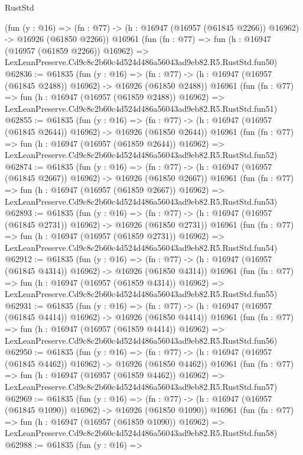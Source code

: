 \begin{lexlean}{RustStd}
\begin{coremodule}
    (fun (y : @16) =>
    (fn : @77) -> (h : @16947 (@16957 (@61845 @2266)) @16962) -> @16926 (@61850 @2266))
    @16961
    (fun (fn : @77) =>
    fun (h : @16947 (@16957 (@61859 @2266)) @16962) =>
    LexLeanPreserve.Cd9c8c2b60c4d524d486a56043ad9eb82.R5.RustStd.fun50)
@62836 := @61835
    (fun (y : @16) =>
    (fn : @77) -> (h : @16947 (@16957 (@61845 @2488)) @16962) -> @16926 (@61850 @2488))
    @16961
    (fun (fn : @77) =>
    fun (h : @16947 (@16957 (@61859 @2488)) @16962) =>
    LexLeanPreserve.Cd9c8c2b60c4d524d486a56043ad9eb82.R5.RustStd.fun51)
@62855 := @61835
    (fun (y : @16) =>
    (fn : @77) -> (h : @16947 (@16957 (@61845 @2644)) @16962) -> @16926 (@61850 @2644))
    @16961
    (fun (fn : @77) =>
    fun (h : @16947 (@16957 (@61859 @2644)) @16962) =>
    LexLeanPreserve.Cd9c8c2b60c4d524d486a56043ad9eb82.R5.RustStd.fun52)
@62874 := @61835
    (fun (y : @16) =>
    (fn : @77) -> (h : @16947 (@16957 (@61845 @2667)) @16962) -> @16926 (@61850 @2667))
    @16961
    (fun (fn : @77) =>
    fun (h : @16947 (@16957 (@61859 @2667)) @16962) =>
    LexLeanPreserve.Cd9c8c2b60c4d524d486a56043ad9eb82.R5.RustStd.fun53)
@62893 := @61835
    (fun (y : @16) =>
    (fn : @77) -> (h : @16947 (@16957 (@61845 @2731)) @16962) -> @16926 (@61850 @2731))
    @16961
    (fun (fn : @77) =>
    fun (h : @16947 (@16957 (@61859 @2731)) @16962) =>
    LexLeanPreserve.Cd9c8c2b60c4d524d486a56043ad9eb82.R5.RustStd.fun54)
@62912 := @61835
    (fun (y : @16) =>
    (fn : @77) -> (h : @16947 (@16957 (@61845 @4314)) @16962) -> @16926 (@61850 @4314))
    @16961
    (fun (fn : @77) =>
    fun (h : @16947 (@16957 (@61859 @4314)) @16962) =>
    LexLeanPreserve.Cd9c8c2b60c4d524d486a56043ad9eb82.R5.RustStd.fun55)
@62931 := @61835
    (fun (y : @16) =>
    (fn : @77) -> (h : @16947 (@16957 (@61845 @4414)) @16962) -> @16926 (@61850 @4414))
    @16961
    (fun (fn : @77) =>
    fun (h : @16947 (@16957 (@61859 @4414)) @16962) =>
    LexLeanPreserve.Cd9c8c2b60c4d524d486a56043ad9eb82.R5.RustStd.fun56)
@62950 := @61835
    (fun (y : @16) =>
    (fn : @77) -> (h : @16947 (@16957 (@61845 @4462)) @16962) -> @16926 (@61850 @4462))
    @16961
    (fun (fn : @77) =>
    fun (h : @16947 (@16957 (@61859 @4462)) @16962) =>
    LexLeanPreserve.Cd9c8c2b60c4d524d486a56043ad9eb82.R5.RustStd.fun57)
@62969 := @61835
    (fun (y : @16) =>
    (fn : @77) -> (h : @16947 (@16957 (@61845 @1090)) @16962) -> @16926 (@61850 @1090))
    @16961
    (fun (fn : @77) =>
    fun (h : @16947 (@16957 (@61859 @1090)) @16962) =>
    LexLeanPreserve.Cd9c8c2b60c4d524d486a56043ad9eb82.R5.RustStd.fun58)
@62988 := @61835
    (fun (y : @16) =>

\end{coremodule}
\end{lexlean}
